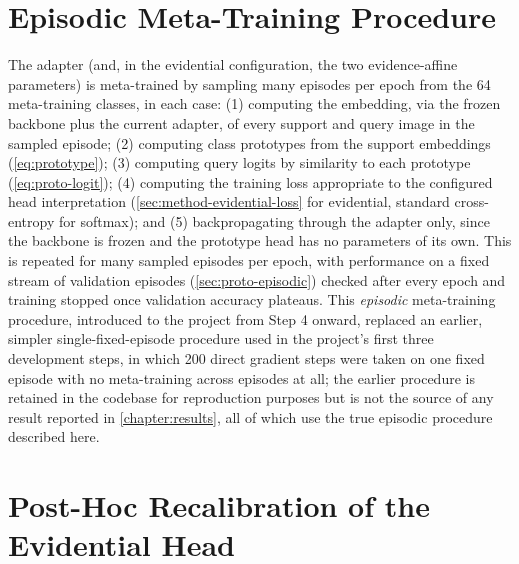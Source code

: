 \documentclass{iutbscthesis}
\begin{document}
\section{Episodic Meta-Training Procedure}
\label{sec:method-training}

The adapter (and, in the evidential configuration, the two evidence-affine parameters) is meta-trained by sampling many episodes per epoch from the 64 meta-training classes, in each case: (1) computing the embedding, via the frozen backbone plus the current adapter, of every support and query image in the sampled episode; (2) computing class prototypes from the support embeddings (\autoref{eq:prototype}); (3) computing query logits by similarity to each prototype (\autoref{eq:proto-logit}); (4) computing the training loss appropriate to the configured head interpretation (\autoref{sec:method-evidential-loss} for evidential, standard cross-entropy for softmax); and (5) backpropagating through the adapter only, since the backbone is frozen and the prototype head has no parameters of its own. This is repeated for many sampled episodes per epoch, with performance on a fixed stream of validation episodes (\autoref{sec:proto-episodic}) checked after every epoch and training stopped once validation accuracy plateaus. This \emph{episodic} meta-training procedure, introduced to the project from Step 4 onward, replaced an earlier, simpler single-fixed-episode procedure used in the project's first three development steps, in which 200 direct gradient steps were taken on one fixed episode with no meta-training across episodes at all; the earlier procedure is retained in the codebase for reproduction purposes but is not the source of any result reported in \autoref{chapter:results}, all of which use the true episodic procedure described here.

\section{Post-Hoc Recalibration of the Evidential Head}
\label{sec:method-recalibration}
\end{document}
